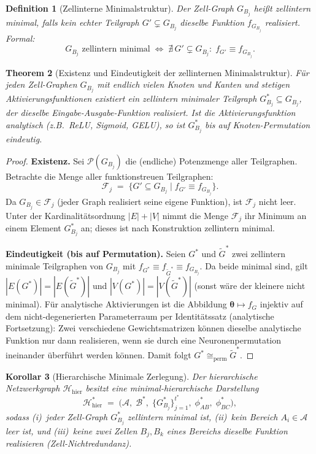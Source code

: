 ﻿\documentclass[12pt, a4paper, openany]{report}
\newtheorem{theorem}{Theorem}[chapter]
\newtheorem{corollary}[theorem]{Korollar}
\newtheorem{definition}[theorem]{Definition}
\newcommand{\calH}{\mathcal{H}}
\newcommand{\calA}{\mathcal{A}}
\newcommand{\calB}{\mathcal{B}}
\newcommand{\calF}{\mathcal{F}}
\newcommand{\calP}{\mathcal{P}}
\begin{document}
\begin{definition}[Zellinterne Minimalstruktur]
\label{def:cell_minimal}
Der Zell-Graph $G_{B_j}$ heißt \emph{zellintern minimal}, falls kein echter
Teilgraph $G' \subsetneq G_{B_j}$ dieselbe Funktion $f_{G_{B_j}}$ realisiert.
Formal:
\[
  G_{B_j} \text{ zellintern minimal}
  \;\Leftrightarrow\;
  \nexists\, G' \subsetneq G_{B_j}:\;
  f_{G'} \equiv f_{G_{B_j}}.
\]
\end{definition}

\begin{theorem}[Existenz und Eindeutigkeit der zellinternen Minimalstruktur]
\label{thm:cell_minimal_existence}
Für jeden Zell-Graphen $G_{B_j}$ mit endlich vielen Knoten und Kanten und
stetigen Aktivierungsfunktionen existiert ein zellintern minimaler Teilgraph
$G^*_{B_j} \subseteq G_{B_j}$, der dieselbe Eingabe-Ausgabe-Funktion
realisiert.  Ist die Aktivierungsfunktion analytisch (z.B.\ ReLU, Sigmoid,
GELU), so ist $G^*_{B_j}$ bis auf Knoten-Permutation eindeutig.
\end{theorem}

\begin{proof}
\textbf{Existenz.}
Sei $\calP(G_{B_j})$ die (endliche) Potenzmenge aller Teilgraphen.
Betrachte die Menge aller funktionstreuen Teilgraphen:
\[
  \calF_j \;=\; \bigl\{G' \subseteq G_{B_j} \;\big|\; f_{G'} \equiv f_{G_{B_j}}\bigr\}.
\]
Da $G_{B_j} \in \calF_j$ (jeder Graph realisiert seine eigene Funktion), ist
$\calF_j$ nicht leer.  Unter der Kardinalitätsordnung $|E| + |V|$ nimmt die
Menge $\calF_j$ ihr Minimum an einem Element $G^*_{B_j}$ an; dieses ist nach
Konstruktion zellintern minimal.

\textbf{Eindeutigkeit (bis auf Permutation).}
Seien $G^*$ und $\tilde{G}^*$ zwei zellintern minimale Teilgraphen von
$G_{B_j}$ mit $f_{G^*} \equiv f_{\tilde{G}^*} \equiv f_{G_{B_j}}$.  Da beide
minimal sind, gilt $|E(G^*)| = |E(\tilde{G}^*)|$ und $|V(G^*)| = |V(\tilde{G}^*)|$
(sonst wäre der kleinere nicht minimal).
Für analytische Aktivierungen ist die Abbildung $\bm{\theta} \mapsto f_G$
injektiv auf dem nicht-degenerierten Parameterraum per Identitätssatz
(analytische Fortsetzung): Zwei verschiedene Gewichtsmatrizen können
dieselbe analytische Funktion nur dann realisieren, wenn sie durch eine
Neuronenpermutation ineinander überführt werden können.  Damit folgt
$G^* \cong_{\mathrm{perm}} \tilde{G}^*$.
\end{proof}

\begin{corollary}[Hierarchische Minimale Zerlegung]
\label{cor:hierarchical_decomposition}
Der hierarchische Netzwerkgraph $\calH_{\mathrm{hier}}$ besitzt eine
\emph{minimal-hierarchische Darstellung}
\[
  \calH^*_{\mathrm{hier}}
  \;=\;
  \bigl(\calA,\; \calB^*,\; \{G^*_{B_j}\}_{j=1}^{t^*},\;
        \phi^*_{AB},\; \phi^*_{BC}\bigr),
\]
sodass (i)~jeder Zell-Graph $G^*_{B_j}$ zellintern minimal ist,
(ii)~kein Bereich $A_i \in \calA$ leer ist, und (iii)~keine zwei
Zellen $B_j, B_k$ eines Bereichs dieselbe Funktion realisieren
(Zell-Nichtredundanz).
\end{corollary}
\end{document}
